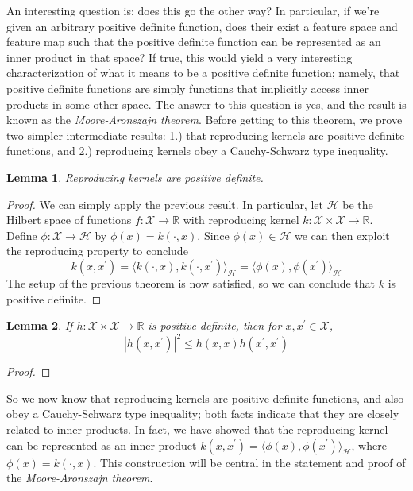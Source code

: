 \documentclass[12pt]{article}
\newcommand*{\abs}[1]{\left\lvert#1\right\rvert}
\newcommand{\R}{\mathbb{R}}
\newtheorem{lemma}{Lemma}
\begin{document}
 An interesting question is: does this go the other way? In particular, if we're given an arbitrary positive definite function, does their exist a feature space and feature map such that the positive definite 
 function can be represented as an inner product in that space? If true, this would yield a very interesting characterization of what it means to be a positive definite function; namely, that positive definite 
 functions are simply functions that implicitly access inner products in some other space. The answer to this question is yes, and the result is known as the \textit{Moore-Aronszajn theorem}. Before getting 
 to this theorem, we prove two simpler intermediate results: 1.) that reproducing kernels are positive-definite functions, and 2.) reproducing kernels obey a Cauchy-Schwarz type inequality.
 
 \begin{lemma} 
 Reproducing kernels are positive definite. 
 \end{lemma}
 \begin{proof} 
 We can simply apply the previous result. In particular, let $\mathcal{H}$ be the Hilbert space of functions $f: \mathcal{X} \to \R$ with reproducing kernel $k: \mathcal{X} \times \mathcal{X} \to \R$. 
 Define $\phi: \mathcal{X} \to \mathcal{H}$ by $\phi(x) = k(\cdot, x)$. Since $\phi(x) \in \mathcal{H}$ we can then exploit the reproducing property to conclude
 \[k(x, x^\prime) = \langle k(\cdot, x), k(\cdot, x^\prime) \rangle_{\mathcal{H}} = \langle \phi(x), \phi(x^\prime) \rangle_{\mathcal{H}}\]
 The setup of the previous theorem is now satisfied, so we can conclude that $k$ is positive definite. 
 \end{proof}
 
 \begin{lemma} 
 If $h: \mathcal{X} \times \mathcal{X} \to \R$ is positive definite, then for $x, x^\prime \in \mathcal{X}$, 
 \[\abs{h(x, x^\prime)}^2 \leq h(x, x)h(x^\prime, x^\prime)\]
 \end{lemma}
 \begin{proof} 
 
 \end{proof}
 So we now know that reproducing kernels are positive definite functions, and also obey a Cauchy-Schwarz type inequality; both facts indicate that they are closely related to inner products. In fact, 
 we have showed that the reproducing kernel can be represented as an inner product $k(x, x^\prime) = \langle \phi(x), \phi(x^\prime) \rangle_{\mathcal{H}}$, where $\phi(x) = k(\cdot, x)$. This construction 
 will be central in the statement and proof of the \textit{Moore-Aronszajn theorem}. 
 
\end{document}
